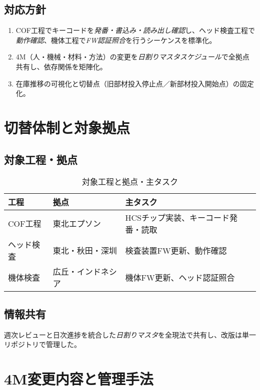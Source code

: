 \documentclass[journal,twocolumn]{IEEEtran}
\begin{document}
\subsection{対応方針}
\begin{enumerate}
  \item COF工程でキーコードを\emph{発番・書込み・読み出し確認}し、ヘッド検査工程で\emph{動作確認}、機体工程で\emph{FW認証照合}を行うシーケンスを標準化。
  \item 4M（人・機械・材料・方法）の変更を\emph{日割りマスタスケジュール}で全拠点共有し、依存関係を矩陣化。
  \item 在庫推移の可視化と切替点（旧部材投入停止点／新部材投入開始点）の固定化。
\end{enumerate}

\section{切替体制と対象拠点}
\subsection{対象工程・拠点}
\begin{table}[t]
\caption{対象工程と拠点・主タスク}
\label{tab:sitemap}
\centering
\begin{tabular}{@{}llp{4.5cm}@{}}
\toprule
工程 & 拠点 & 主タスク \\
\midrule
COF工程 & 東北エプソン & HCSチップ実装、キーコード発番・読取 \\
ヘッド検査 & 東北・秋田・深圳 & 検査装置FW更新、動作確認 \\
機体検査 & 広丘・インドネシア & 機体FW更新、ヘッド認証照合 \\
\bottomrule
\end{tabular}
\end{table}

\subsection{情報共有}
週次レビューと日次進捗を統合した\emph{日割りマスタ}を全現法で共有し、改版は単一リポジトリで管理した。

\section{4M変更内容と管理手法}
\end{document}
